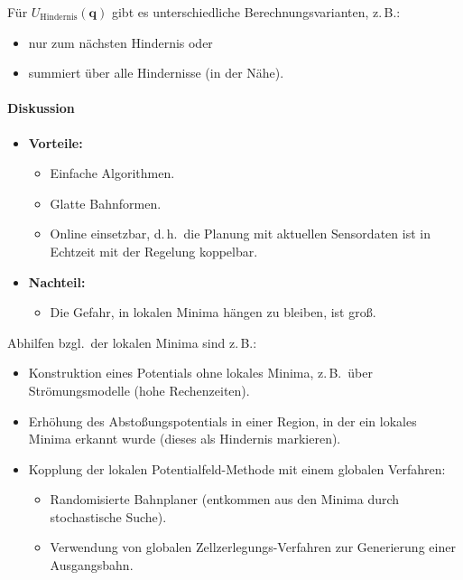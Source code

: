 \documentclass[a4paper, 11pt, accentcolor = tud3b]{tudreport}
\renewcommand{\vec}[1]{\boldsymbol{\mathbf{#1}}}
\renewcommand{\dh}{d.\,h.~}
\newcommand{\bzgl}{bzgl.~}
\newcommand{\zB}{z.\,B.~}
\begin{document}
					Für \( U_\text{Hindernis}(\vec{q}) \) gibt es unterschiedliche Berechnungsvarianten, z.\,B.:
					\begin{itemize}
						\item nur zum nächsten Hindernis oder
						\item summiert über alle Hindernisse (in der Nähe).
					\end{itemize}
				
				\paragraph{Diskussion}
					\begin{itemize}
						\item \textbf{Vorteile:}
							\begin{itemize}
								\item Einfache Algorithmen.
								\item Glatte Bahnformen.
								\item Online einsetzbar, \dh die Planung mit aktuellen Sensordaten ist in Echtzeit mit der Regelung koppelbar.
							\end{itemize}
						\item \textbf{Nachteil:}
							\begin{itemize}
								\item Die Gefahr, in lokalen Minima hängen zu bleiben, ist groß.
							\end{itemize}
					\end{itemize}
				
					Abhilfen \bzgl der lokalen Minima sind z.\,B.:
					\begin{itemize}
						\item Konstruktion eines Potentials ohne lokales Minima, \zB über Strömungsmodelle (hohe Rechenzeiten).
						\item Erhöhung des Abstoßungspotentials in einer Region, in der ein lokales Minima erkannt wurde (dieses als Hindernis markieren).
						\item Kopplung der lokalen Potentialfeld-Methode mit einem globalen Verfahren:
							\begin{itemize}
								\item Randomisierte Bahnplaner (entkommen aus den Minima durch stochastische Suche).
								\item Verwendung von globalen Zellzerlegungs-Verfahren zur Generierung einer Ausgangsbahn.
							\end{itemize}
					\end{itemize}
\end{document}
